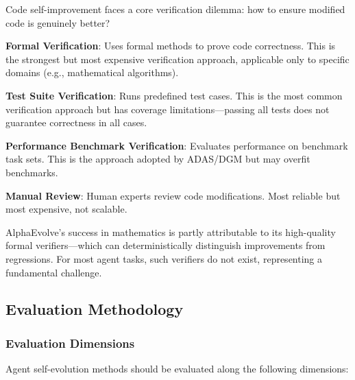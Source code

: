 Code self-improvement faces a core verification dilemma: how to ensure modified code is genuinely better?

\textbf{Formal Verification}: Uses formal methods to prove code correctness. This is the strongest but most expensive verification approach, applicable only to specific domains (e.g., mathematical algorithms).

\textbf{Test Suite Verification}: Runs predefined test cases. This is the most common verification approach but has coverage limitations---passing all tests does not guarantee correctness in all cases.

\textbf{Performance Benchmark Verification}: Evaluates performance on benchmark task sets. This is the approach adopted by ADAS/DGM but may overfit benchmarks.

\textbf{Manual Review}: Human experts review code modifications. Most reliable but most expensive, not scalable.

AlphaEvolve's success in mathematics is partly attributable to its high-quality formal verifiers---which can deterministically distinguish improvements from regressions. For most agent tasks, such verifiers do not exist, representing a fundamental challenge.

\subsection{Evaluation Methodology}\label{sec:ch3-evaluation}

\subsubsection{Evaluation Dimensions}

Agent self-evolution methods should be evaluated along the following dimensions:

